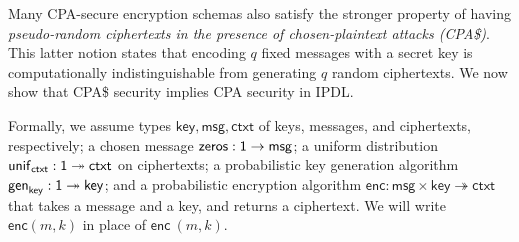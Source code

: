 \renewcommand{\key}{\mathsf{key}}
\renewcommand{\msg}{\mathsf{msg}}
\renewcommand{\ctxt}{\mathsf{ctxt}}
\renewcommand{\gen}{\mathsf{gen}}
\newcommand{\unif}{\mathsf{unif}}
\renewcommand{\enc}{\mathsf{enc}}
\renewcommand{\zeros}{\mathsf{zeros}}
\renewcommand{\Msg}{\mathsf{Msg}}
\renewcommand{\MsgL}{\mathsf{Msg}_L}
\renewcommand{\MsgR}{\mathsf{Msg}_R}
\renewcommand{\Key}{\mathsf{Key}}
\renewcommand{\Enc}{\mathsf{Enc}}

Many CPA-secure encryption schemas also satisfy the stronger property of having \emph{pseudo-random ciphertexts in the presence of chosen-plaintext attacks (CPA\$)}. This latter notion states that encoding $q$ fixed messages with a secret key is computationally indistinguishable from generating $q$ random ciphertexts. We now show that CPA\$ security implies CPA security in \textsf{IPDL}.

Formally, we assume types $\key, \msg, \ctxt$ of keys, messages, and ciphertexts, respectively; a chosen message $\zeros : \one \rightarrow \msg$; a uniform distribution $\unif_\ctxt : \one \twoheadrightarrow \ctxt$ on ciphertexts; a probabilistic key generation algorithm $\gen_\key : \one \twoheadrightarrow \key$; and a probabilistic encryption algorithm $\enc : \msg \times \key \twoheadrightarrow \ctxt$ that takes a message and a key, and returns a ciphertext. We will write $\enc(m,k)$ in place of $\enc \ (m,k)$.

